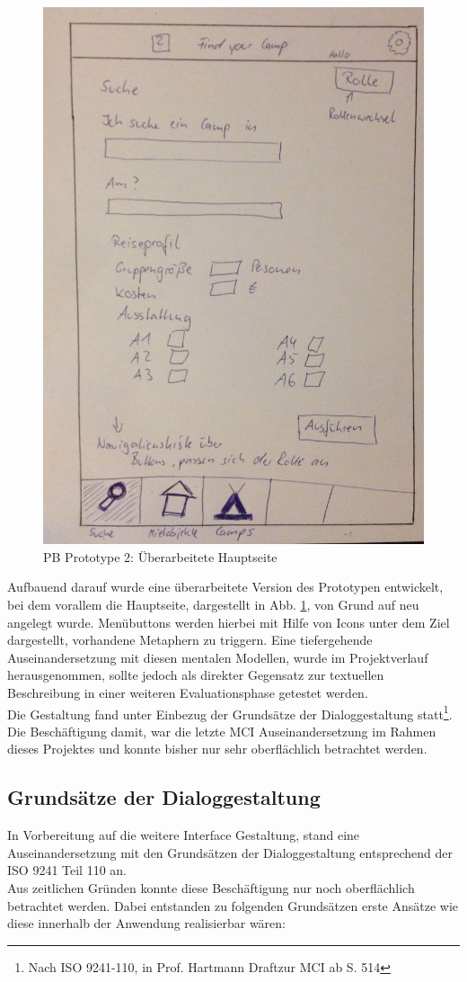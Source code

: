 \begin{figure}
\centering
\includegraphics[width=.5\textwidth]{./images/mainneu.JPG}
\caption{PB Prototype 2: Überarbeitete Hauptseite }
\label{mainneu}
\end{figure}

Aufbauend darauf wurde eine überarbeitete Version des Prototypen entwickelt, bei dem vorallem die Hauptseite, dargestellt in Abb. \ref{mainneu}, von Grund auf neu angelegt wurde. Menübuttons werden hierbei mit Hilfe von Icons unter dem Ziel dargestellt, vorhandene Metaphern zu triggern. Eine tiefergehende Auseinandersetzung mit diesen mentalen Modellen, wurde im Projektverlauf herausgenommen, sollte jedoch als direkter Gegensatz zur textuellen Beschreibung in einer weiteren Evaluationsphase getestet werden. \\

 Die Gestaltung fand unter Einbezug der Grundsätze der Dialoggestaltung statt\footnote{Nach ISO 9241-110, in Prof. Hartmann Draftzur MCI ab S. 514}. Die Beschäftigung damit, war die letzte MCI Auseinandersetzung im Rahmen dieses Projektes und konnte bisher nur sehr oberflächlich betrachtet werden. 


\newpage

\subsection{Grundsätze der Dialoggestaltung}
 In Vorbereitung auf die weitere Interface Gestaltung, stand eine Auseinandersetzung mit den Grundsätzen der Dialoggestaltung entsprechend der ISO 9241 Teil 110 an. \\
 Aus zeitlichen Gründen konnte diese Beschäftigung nur noch oberflächlich betrachtet werden. Dabei entstanden zu folgenden Grundsätzen erste Ansätze wie diese innerhalb der Anwendung realisierbar wären:

